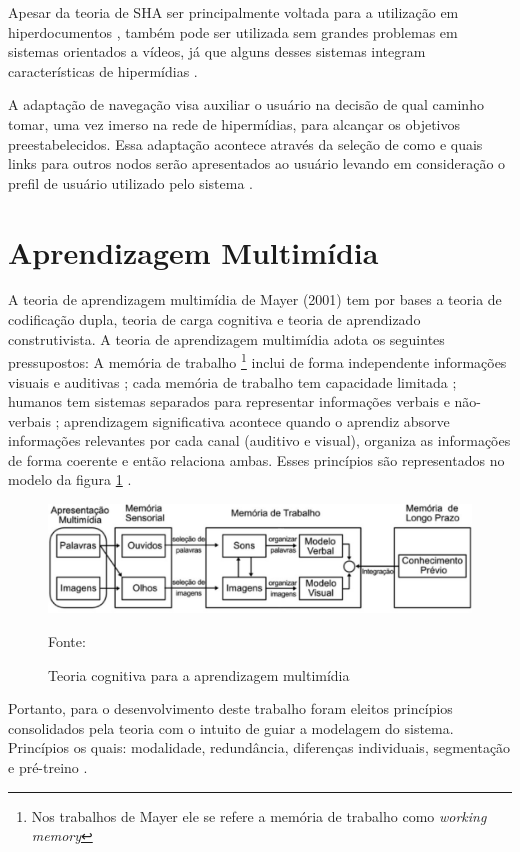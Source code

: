 Apesar da teoria de SHA ser principalmente voltada para a utilização em hiperdocumentos \cite{brusilovsky1998}, também pode ser utilizada sem grandes problemas em sistemas orientados a vídeos, já que alguns desses sistemas integram características de hipermídias \cite{aubert2005}.

A adaptação de navegação visa auxiliar o usuário na decisão de qual caminho tomar, uma vez imerso na rede de hipermídias, para alcançar os objetivos preestabelecidos. Essa adaptação acontece através da seleção de como e quais links para outros nodos serão apresentados ao usuário levando em consideração o prefil de usuário utilizado pelo sistema \cite{brusilovsky1996}.

\section{Aprendizagem Multimídia}

A teoria de aprendizagem multimídia de Mayer (2001) tem por bases a teoria de codificação dupla, teoria de carga cognitiva e teoria de aprendizado construtivista. A teoria de aprendizagem multimídia adota os seguintes pressupostos: A memória de trabalho \footnote{Nos trabalhos de Mayer ele se refere a memória de trabalho como \textit{working memory}} inclui de forma independente informações visuais e auditivas \cite{baddeley1986}; cada memória de trabalho tem capacidade limitada \cite{chandler1992}; humanos tem sistemas separados para representar  informações verbais e não-verbais \cite{paivio1986}; aprendizagem significativa acontece quando o aprendiz absorve informações relevantes por cada canal (auditivo e visual), organiza as informações de forma coerente e então relaciona ambas. Esses princípios são representados no modelo da figura \ref{fig:aprendizado} \cite{moreno2000}.

\begin{figure}[h!]
	\centering
  	\includegraphics[width=.9\linewidth]{figuras/aprendizado.eps}
  	\caption{Teoria cognitiva para a aprendizagem multimídia}
  	\small{Fonte: \cite{mayer2001}}
  	\label{fig:aprendizado}
\end{figure}

Portanto, para o desenvolvimento deste trabalho foram eleitos princípios consolidados pela teoria com o intuito de guiar a modelagem do sistema. Princípios os quais: modalidade, redundância, diferenças individuais, segmentação e pré-treino \cite{clark2011, mayer2001, moreno2000}.


